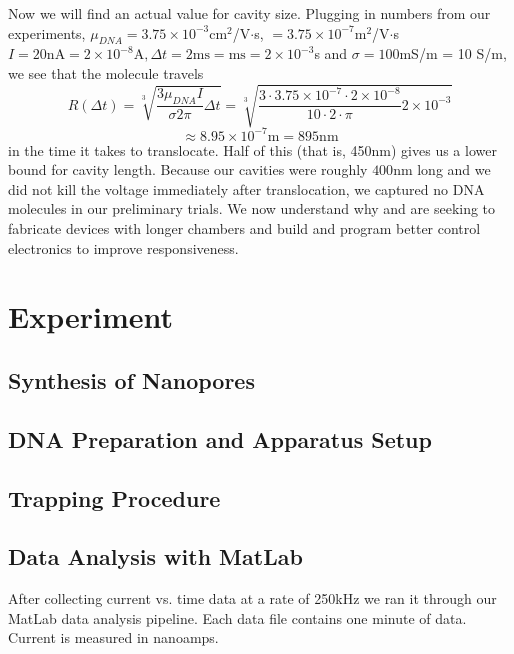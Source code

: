 \documentclass[aps,prl,preprint,groupedaddress]{revtex4}
\begin{document}
Now we will find an actual value for cavity size. Plugging in numbers from our experiments, \(\mu_{DNA} = 3.75 \times 10^{-3}\)cm$^2$/V$\cdot$s, \( = 3.75 \times 10^{-7}\)m$^2$/V$\cdot$s \cite{mobility} \(I = 20 \mathrm{nA} = 2\times 10^{-8}\mathrm{A}, \Delta t = 2\mathrm{ms} = \mathrm{ms} = 2 \times 10^{-3}\)s and \(\sigma = 100\)mS/m = 10 S/m\cite{CRC}, we see that the molecule travels \[R(\Delta t) = \sqrt[3]{\frac{3 \mu_{DNA} I}{\sigma 2 \pi}\Delta t} = \sqrt[3]{\frac{3\cdot 3.75\times 10^{-7}\cdot 2\times10^{-8}}{10\cdot 2\cdot \pi} 2\times10^{-3}}\] \[\approx 8.95 \times 10^{-7}\mathrm{m} = 895 \mathrm{nm} \] in the time it takes to translocate. Half of this (that is, 450nm) gives us a lower bound for cavity length. Because our cavities were roughly \(400\)nm long and we did not kill the voltage immediately after translocation, we captured no DNA molecules in our preliminary trials. We now understand why and are seeking to fabricate devices with longer chambers and build and program better control electronics to improve responsiveness. 

\section{Experiment}

\subsection{Synthesis of Nanopores}



\subsection{DNA Preparation and Apparatus Setup}



\subsection{Trapping Procedure}



\subsection{Data Analysis with MatLab}

After collecting current vs. time data at a rate of 250kHz we ran it through our MatLab data analysis pipeline. Each data file contains one minute of data. Current is measured in nanoamps.
\end{document}
